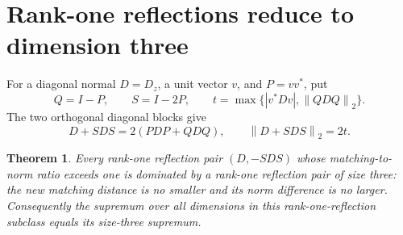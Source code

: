 \documentclass[11pt,letterpaper]{article}
\newtheorem{theorem}{Theorem}[section]\newtheorem{lemma}[theorem]{Lemma}\newtheorem{proposition}[theorem]{Proposition}\newtheorem{corollary}[theorem]{Corollary}
\theoremstyle{remark}\newtheorem{remark}[theorem]{Remark}
\newcommand{\norm}[1]{\left\lVert#1\right\rVert_2}\newcommand{\abs}[1]{\left|#1\right|}\newcommand{\diag}{\operatorname{diag}}\newcommand{\rank}{\operatorname{rank}}
\begin{document}
\section{Rank-one reflections reduce to dimension three}\label{sec:rankone}
For a diagonal normal $D=D_z$, a unit vector $v$, and $P=vv^*$, put
\[
Q=I-P,\qquad S=I-2P,\qquad
 t=\max\{|v^*Dv|,\norm{QDQ}\}.
\]
The two orthogonal diagonal blocks give
\begin{equation}\label{eq:pinching}
D+SDS=2(PDP+QDQ),\qquad \norm{D+SDS}=2t.
\end{equation}
\begin{theorem}\label{thm:rankone}
Every rank-one reflection pair $(D,-SDS)$ whose matching-to-norm ratio exceeds one is dominated by a rank-one reflection pair of size three: the new matching distance is no smaller and its norm difference is no larger. Consequently the supremum over all dimensions in this rank-one-reflection subclass equals its size-three supremum.
\end{theorem}
\end{document}
